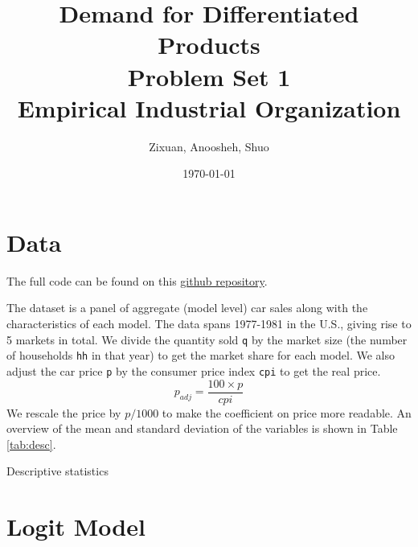 \documentclass[12pt]{article}[margin=1in]
\title{\textbf{Demand for Differentiated Products} \\
\vspace{.3cm}
\large Problem Set 1 \\
Empirical Industrial Organization}
\author{Zixuan, Anoosheh, Shuo}
\date{\today}
\begin{document}
\maketitle

\setcounter{page}{1}

\section{Data}

The full code can be found on this
\href{https://github.com/zixuanffu/empirical_io_ps1}{github repository}.

The dataset is a panel of aggregate (model level) car sales along with the
characteristics of each model. The data spans 1977-1981 in the U.S., giving
rise to 5 markets in total. We divide the quantity sold \verb|q| by the market
size (the number of households \verb|hh| in that year) to get the market share
for each model. We also adjust the car price \verb|p| by the consumer price
index \verb|cpi| to get the real price.
\begin{equation*}
    p_{adj} = \frac{100 \times p}{cpi}
\end{equation*}
We rescale the price by $p/1000$ to make the coefficient on price more readable. An overview of the mean and standard deviation of the variables is shown in Table \ref{tab:desc}.

\begin{table}[h!]
    \fontsize{10pt}{12pt}\selectfont
    \centering
    
    \caption{Descriptive statistics}
    \label{tab:desc}
\end{table}

\section{Logit Model}
\end{document}
